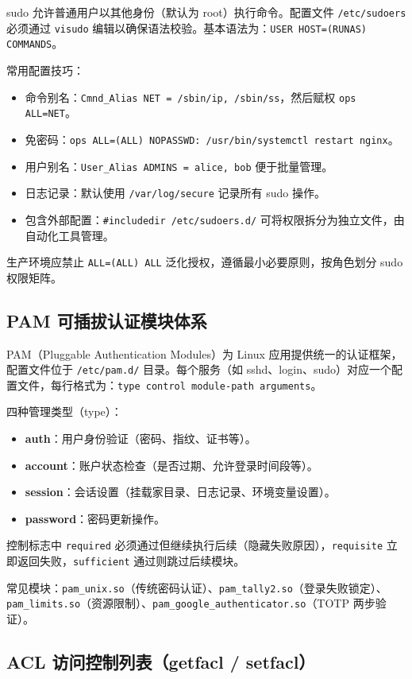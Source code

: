 \documentclass[12pt,UTF8]{ctexbook}
\begin{document}
sudo 允许普通用户以其他身份（默认为 root）执行命令。配置文件 \verb|/etc/sudoers| 必须通过 \verb|visudo| 编辑以确保语法校验。基本语法为：\verb|USER HOST=(RUNAS) COMMANDS|。

常用配置技巧：
\begin{itemize}
	\item 命令别名：\verb|Cmnd_Alias NET = /sbin/ip, /sbin/ss|，然后赋权 \verb|ops ALL=NET|。
	\item 免密码：\verb|ops ALL=(ALL) NOPASSWD: /usr/bin/systemctl restart nginx|。
	\item 用户别名：\verb|User_Alias ADMINS = alice, bob| 便于批量管理。
	\item 日志记录：默认使用 \verb|/var/log/secure| 记录所有 sudo 操作。
	\item 包含外部配置：\verb|#includedir /etc/sudoers.d/| 可将权限拆分为独立文件，由自动化工具管理。
\end{itemize}

生产环境应禁止 \verb|ALL=(ALL) ALL| 泛化授权，遵循最小必要原则，按角色划分 sudo 权限矩阵。

\subsection{PAM 可插拔认证模块体系}

PAM（Pluggable Authentication Modules）为 Linux 应用提供统一的认证框架，配置文件位于 \verb|/etc/pam.d/| 目录。每个服务（如 sshd、login、sudo）对应一个配置文件，每行格式为：\verb|type control module-path arguments|。

四种管理类型（type）：
\begin{itemize}
	\item \textbf{auth}：用户身份验证（密码、指纹、证书等）。
	\item \textbf{account}：账户状态检查（是否过期、允许登录时间段等）。
	\item \textbf{session}：会话设置（挂载家目录、日志记录、环境变量设置）。
	\item \textbf{password}：密码更新操作。
\end{itemize}

控制标志中 \verb|required| 必须通过但继续执行后续（隐藏失败原因），\verb|requisite| 立即返回失败，\verb|sufficient| 通过则跳过后续模块。

常见模块：\verb|pam_unix.so|（传统密码认证）、\verb|pam_tally2.so|（登录失败锁定）、\verb|pam_limits.so|（资源限制）、\verb|pam_google_authenticator.so|（TOTP 两步验证）。

\subsection{ACL 访问控制列表（getfacl / setfacl）}
\end{document}
